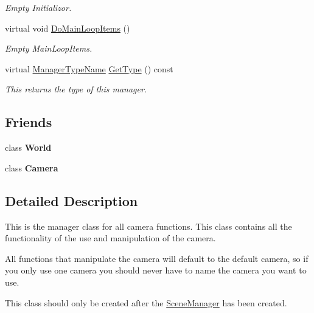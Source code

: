 \begin{DoxyCompactItemize}
\begin{DoxyCompactList}\small\item\em Empty Initializor. \item\end{DoxyCompactList}\item 
virtual void \hyperlink{classphys_1_1CameraManager_aaae22266bccc43f6efa66d2735d7d1d3}{DoMainLoopItems} ()
\begin{DoxyCompactList}\small\item\em Empty MainLoopItems. \item\end{DoxyCompactList}\item 
virtual \hyperlink{classphys_1_1ManagerBase_aaa6ccddf23892eaccb898529414f80a5}{ManagerTypeName} \hyperlink{classphys_1_1CameraManager_a8412ea634307aa280b615a3cc7c9b739}{GetType} () const 
\begin{DoxyCompactList}\small\item\em This returns the type of this manager. \item\end{DoxyCompactList}\end{DoxyCompactItemize}
\subsection*{Friends}
\begin{DoxyCompactItemize}
\item 
\hypertarget{classphys_1_1CameraManager_a7b4bcdf992c21ae83363f25df05b1d25}{
class {\bfseries World}}
\label{d9/d91/classphys_1_1CameraManager_a7b4bcdf992c21ae83363f25df05b1d25}

\item 
\hypertarget{classphys_1_1CameraManager_ad8bd9afbbd7af19d996da80e9d25890d}{
class {\bfseries Camera}}
\label{d9/d91/classphys_1_1CameraManager_ad8bd9afbbd7af19d996da80e9d25890d}

\end{DoxyCompactItemize}


\subsection{Detailed Description}
This is the manager class for all camera functions. This class contains all the functionality of the use and manipulation of the camera. \par
 All functions that manipulate the camera will default to the default camera, so if you only use one camera you should never have to name the camera you want to use. \par
 This class should only be created after the \hyperlink{classphys_1_1SceneManager}{SceneManager} has been created. 

